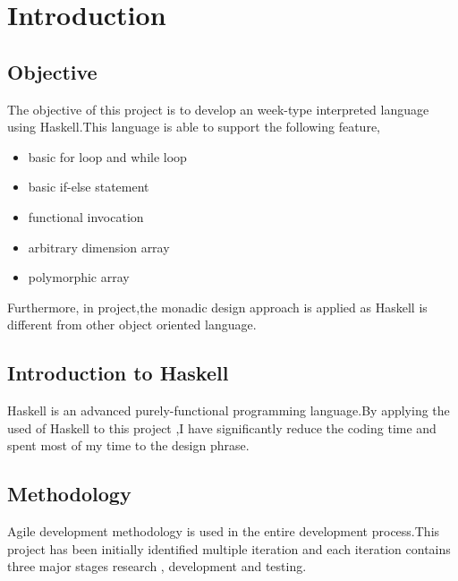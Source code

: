 \chapter{Introduction}
\section{Objective}
The objective of this project is to develop an week-type interpreted language using Haskell.This language is able to support the following feature,
\begin{itemize}
\item basic for loop and while loop
\item basic if-else statement
\item functional invocation 
\item arbitrary dimension array
\item polymorphic array
\end{itemize}

Furthermore, in project,the monadic design approach is applied as Haskell is different from other object oriented language.

\section{Introduction to Haskell} 
Haskell is an advanced purely-functional programming language.By applying the used of Haskell to this project ,I have significantly reduce the coding time and spent most of my time to the design phrase.


\section{Methodology}
Agile development methodology is used in the entire development process.This project has been initially identified multiple iteration and each iteration contains three major stages research , development and testing.